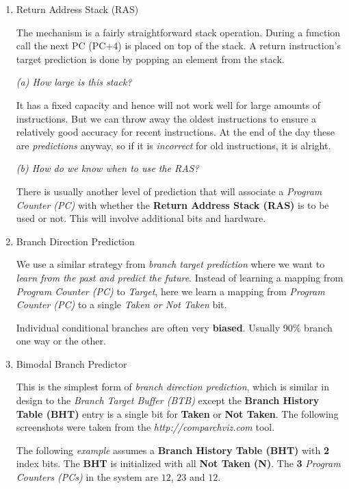 \documentclass[12pt]{article}
\newenvironment{QandA}{\begin{enumerate}[label=\bfseries\alph*.]\bfseries}
                      {\end{enumerate}}
\newenvironment{answered}{\par\quad\normalfont}{}
\begin{document}
\begin{QandA}
\item Return Address Stack (RAS)
\begin{answered}
The mechanism is a fairly straightforward stack operation. During a function call the next PC (PC+4) is placed on top of the stack. A return instruction's target prediction is done by popping an element from the stack.

\textit{(a) How large is this stack?}

It has a fixed capacity and hence will not work well for large amounts of instructions. But we can throw away the oldest instructions to ensure a relatively good accuracy for recent instructions. At the end of the day these are \textit{predictions} anyway, so if it is \textit{incorrect} for old instructions, it is alright.

\textit{(b) How do we know when to use the RAS?}

There is usually another level of prediction that will associate a \textit{Program Counter (PC)} with whether the \textbf{Return Address Stack (RAS)} is to be used or not. This will involve additional bits and hardware. 
\end{answered}

\item Branch Direction Prediction
\begin{answered}
We use a similar strategy from \textit{branch target prediction} where we want to \textit{learn from the past and predict the future}. Instead of learning a mapping from \textit{Program Counter (PC)} to \textit{Target}, here we learn a mapping from \textit{Program Counter (PC)} to a single \textit{Taken or Not Taken} bit. 

Individual conditional branches are often very \textbf{biased}. Usually 90\% branch one way or the other.
\end{answered}

\item Bimodal Branch Predictor
\begin{answered}
This is the simplest form of \textit{branch direction prediction}, which is similar in design to the \textit{Branch Target Buffer (BTB)} except the \textbf{Branch History Table (BHT)} entry is a single bit for \textbf{Taken} or \textbf{Not Taken}. The following screenshots were taken from the \textit{http://comparchviz.com} tool.

The following \textit{example} assumes a \textbf{Branch History Table (BHT)} with \textbf{2} index bits. The \textbf{BHT} is initialized with all \textbf{Not Taken (N)}. The \textbf{3} \textit{Program Counters (PCs)} in the system are $12$, $23$ and $12$.


\end{answered}
\end{QandA}
\end{document}
